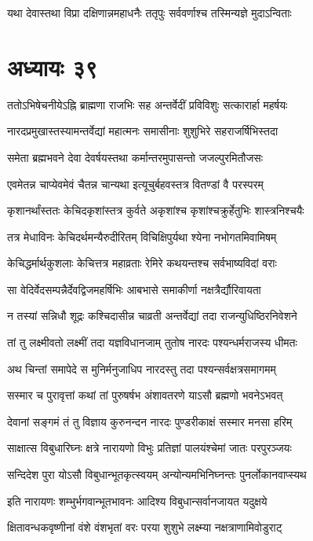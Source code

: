 \twolineshloka
{यथा देवास्तथा विप्रा दक्षिणान्नमहाधनैः}
{ततृपुः सर्ववर्णाश्च तस्मिन्यज्ञे मुदाऽन्विताः}


\chapter{अध्यायः ३९}
\twolineshloka
{ततोऽभिषेचनीयेऽह्नि ब्राह्मणा राजभिः सह}
{अन्तर्वेदीं प्रविविशुः सत्कारार्हा महर्षयः}


\twolineshloka
{नारदप्रमुखास्तस्यामन्तर्वेद्यां महात्मनः}
{समासीनाः शुशुभिरे सहराजर्षिभिस्तदा}


\twolineshloka
{समेता ब्रह्मभवने देवा देवर्षयस्तथा}
{कर्मान्तरमुपासन्तो जजल्पुरमितौजसः}


\twolineshloka
{एवमेतन्न चाप्येवमेवं चैतन्न चान्यथा}
{इत्यूचुर्बहवस्तत्र वितण्डां वै परस्परम्}


\twolineshloka
{कृशानर्थांस्ततः केचिदकृशांस्तत्र कुर्वते}
{अकृशांश्च कृशांश्चक्रुर्हेतुभिः शास्त्रनिश्चयैः}


\twolineshloka
{तत्र मेधाविनः केचिदर्थमन्यैरुदीरितम्}
{विचिक्षिपुर्यथा श्येना नभोगतमिवामिषम्}


\twolineshloka
{केचिद्धर्मार्थकुशलाः केचित्तत्र महाव्रताः}
{रेमिरे कथयन्तश्च सर्वभाष्यविदां वराः}


\twolineshloka
{सा वेदिर्वेदसम्पन्नैर्देवद्विजमहर्षिभिः}
{आबभासे समाकीर्णा नक्षत्रैर्द्यौरिवायता}


\twolineshloka
{न तस्यां सन्निधौ शूद्रः कश्चिदासीन्न चाव्रती}
{अन्तर्वेद्यां तदा राजन्युधिष्ठिरनिवेशने}


\twolineshloka
{तां तु लक्ष्मीवतो लक्ष्मीं तदा यज्ञविधानजाम्}
{तुतोष नारदः पश्यन्धर्मराजस्य धीमतः}


\twolineshloka
{अथ चिन्तां समापेदे स मुनिर्मनुजाधिप}
{नारदस्तु तदा पश्यन्सर्वक्षत्रसमागमम्}


\twolineshloka
{सस्मार च पुरावृत्तां कथां तां पुरुषर्षभ}
{अंशावतरणे याऽसौ ब्रह्मणो भवनेऽभवत्}


\twolineshloka
{देवानां सङ्गमं तं तु विज्ञाय कुरुनन्दन}
{नारदः पुण्डरीकाक्षं सस्मार मनसा हरिम्}


\twolineshloka
{साक्षात्स विबुधारिघ्नः क्षत्रे नारायणो विभुः}
{प्रतिज्ञां पालयंश्चेमां जातः परपुरञ्जयः}


\twolineshloka
{सन्दिदेश पुरा योऽसौ विबुधान्भूतकृत्स्वयम्}
{अन्योन्यमभिनिघ्नन्तः पुनर्लोकानवाप्स्यथ}


\twolineshloka
{इति नारायणः शम्भुर्भगवान्भूतभावनः}
{आदिश्य विबुधान्सर्वानजायत यदुक्षये}


\twolineshloka
{क्षितावन्धकवृष्णीनां वंशे वंशभृतां वरः}
{परया शुशुभे लक्ष्म्या नक्षत्राणामिवोडुराट्}


